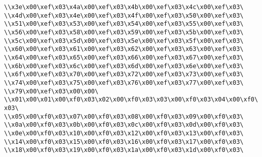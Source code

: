 \verb|\\x3e\x00\xef\x03\x4a\x00\xef\x03\x4b\x00\xef\x03\x4c\x00\xef\x03\|\newline
\verb|\\x4d\x00\xef\x03\x4e\x00\xef\x03\x4f\x00\xef\x03\x50\x00\xef\x03\|\newline
\verb|\\x51\x00\xef\x03\x53\x00\xef\x03\x54\x00\xef\x03\x55\x00\xef\x03\|\newline
\verb|\\x56\x00\xef\x03\x58\x00\xef\x03\x59\x00\xef\x03\x5b\x00\xef\x03\|\newline
\verb|\\x5c\x00\xef\x03\x5d\x00\xef\x03\x5e\x00\xef\x03\x5f\x00\xef\x03\|\newline
\verb|\\x60\x00\xef\x03\x61\x00\xef\x03\x62\x00\xef\x03\x63\x00\xef\x03\|\newline
\verb|\\x64\x00\xef\x03\x65\x00\xef\x03\x66\x00\xef\x03\x67\x00\xef\x03\|\newline
\verb|\\x6b\x00\xef\x03\x6c\x00\xef\x03\x6d\x00\xef\x03\x6e\x00\xef\x03\|\newline
\verb|\\x6f\x00\xef\x03\x70\x00\xef\x03\x72\x00\xef\x03\x73\x00\xef\x03\|\newline
\verb|\\x74\x00\xef\x03\x75\x00\xef\x03\x76\x00\xef\x03\x77\x00\xef\x03\|\newline
\verb|\\x79\x00\xef\x03\x00\x00\|\newline
\verb|\\x01\x00\x01\x00\xf0\x03\x02\x00\xf0\x03\x03\x00\xf0\x03\x04\x00\xf0\x03\|\newline
\verb|\\x05\x00\xf0\x03\x07\x00\xf0\x03\x08\x00\xf0\x03\x09\x00\xf0\x03\|\newline
\verb|\\x0a\x00\xf0\x03\x0b\x00\xf0\x03\x0c\x00\xf0\x03\x0d\x00\xf0\x03\|\newline
\verb|\\x0e\x00\xf0\x03\x10\x00\xf0\x03\x12\x00\xf0\x03\x13\x00\xf0\x03\|\newline
\verb|\\x14\x00\xf0\x03\x15\x00\xf0\x03\x16\x00\xf0\x03\x17\x00\xf0\x03\|\newline
\verb|\\x18\x00\xf0\x03\x19\x00\xf0\x03\x1a\x00\xf0\x03\x1d\x00\xf0\x03\|\newline
